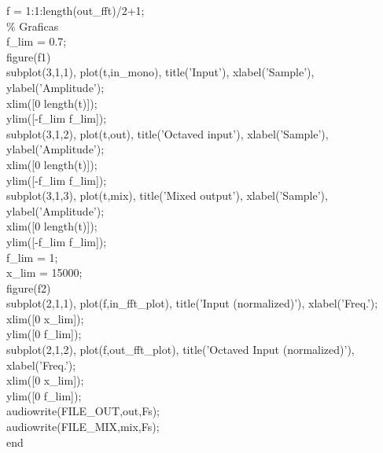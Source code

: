 \noindent f = 1:1:length(out\_fft)/2+1;\\
\% Graficas\\
f\_lim = 0.7;\\
figure(f1)\\
subplot(3,1,1), plot(t,in\_mono), title('Input'), xlabel('Sample'), ylabel('Amplitude');\\
xlim([0 length(t)]);\\
ylim([-f\_lim f\_lim]);\\
subplot(3,1,2), plot(t,out), title('Octaved input'), xlabel('Sample'), ylabel('Amplitude');\\
xlim([0 length(t)]);\\
ylim([-f\_lim f\_lim]);\\
subplot(3,1,3), plot(t,mix), title('Mixed output'), xlabel('Sample'), ylabel('Amplitude');\\
xlim([0 length(t)]);\\
ylim([-f\_lim f\_lim]);\\

\noindent f\_lim = 1;\\
x\_lim = 15000;\\
figure(f2)\\
subplot(2,1,1), plot(f,in\_fft\_plot), title('Input (normalized)'), xlabel('Freq.');\\
xlim([0 x\_lim]);\\
ylim([0 f\_lim]);\\
subplot(2,1,2), plot(f,out\_fft\_plot), title('Octaved Input (normalized)'), xlabel('Freq.');\\
xlim([0 x\_lim]);\\
ylim([0 f\_lim]);\\

\noindent audiowrite(FILE\_OUT,out,Fs);\\
audiowrite(FILE\_MIX,mix,Fs);\\
end\\